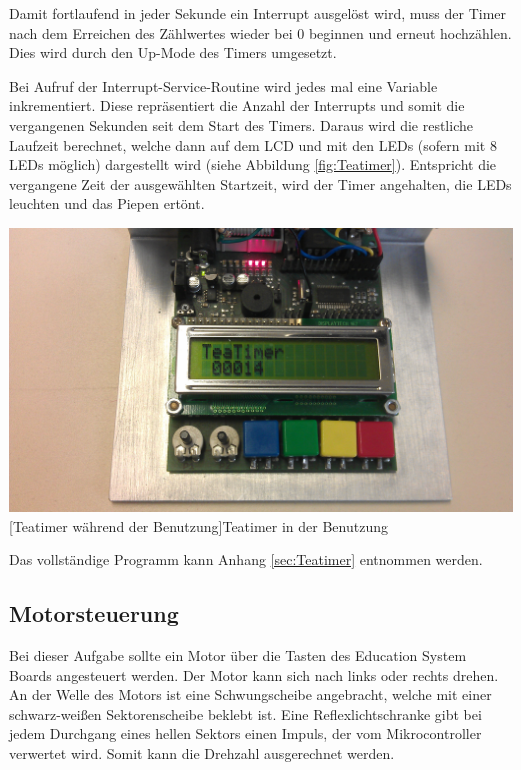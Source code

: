 \documentclass[12pt,a4paper,bibliography=totocnumbered,listof=totocnumbered]{scrartcl}
\begin{document}
Damit fortlaufend in jeder Sekunde ein Interrupt ausgelöst wird, muss der Timer nach dem Erreichen des Zählwertes wieder bei 0 beginnen und erneut hochzählen. Dies wird durch den Up-Mode des Timers umgesetzt.

\vspace{1em}


Bei Aufruf der Interrupt-Service-Routine wird jedes mal eine Variable inkrementiert. Diese repräsentiert die Anzahl der Interrupts und somit die vergangenen Sekunden seit dem Start des Timers. Daraus wird die restliche Laufzeit berechnet, welche dann auf dem LCD und mit den LEDs (sofern mit 8 LEDs möglich) dargestellt wird (siehe Abbildung \ref{fig:Teatimer}). Entspricht die vergangene Zeit der ausgewählten Startzeit, wird der Timer angehalten, die LEDs leuchten und das Piepen ertönt.

\vspace{1em}


\vspace{1em}
\begin{minipage}{\linewidth}
	\centering
	\includegraphics[width=0.7\linewidth]{img/TeaTimer2.jpg}
	[Teatimer während der Benutzung]{Teatimer in der Benutzung}
	\label{fig:Teatimer}
\end{minipage}

\vspace{1em}
Das vollständige Programm kann Anhang \ref{sec:Teatimer} entnommen werden.

\pagebreak

\subsection{Motorsteuerung}
Bei dieser Aufgabe sollte ein Motor über die Tasten des Education System Boards angesteuert werden. Der Motor kann sich nach links oder rechts drehen. An der Welle des Motors ist eine Schwungscheibe angebracht, welche mit einer schwarz-weißen Sektorenscheibe beklebt ist. Eine Reflexlichtschranke gibt bei jedem Durchgang eines hellen Sektors einen Impuls, der vom Mikrocontroller verwertet wird. Somit kann die Drehzahl ausgerechnet werden.
\end{document}
